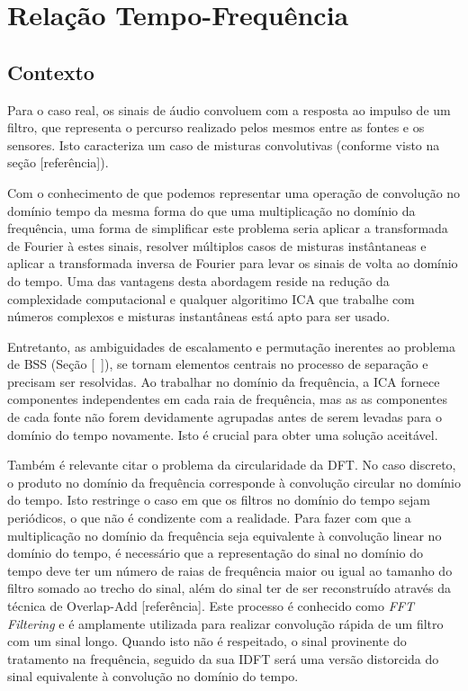 
\section{Relação Tempo-Frequência}
    
    \subsection{Contexto}
        Para o caso real, os sinais de áudio convoluem com a resposta ao impulso de um filtro, que representa o percurso realizado pelos mesmos entre as fontes e os sensores. Isto caracteriza um caso de misturas convolutivas (conforme visto na seção [referência]). 
        
        Com o conhecimento de que podemos representar uma operação de convolução no domínio tempo da mesma forma do que uma multiplicação no domínio da frequência, uma forma de simplificar este problema seria aplicar a transformada de Fourier à estes sinais, resolver múltiplos casos de misturas instântaneas e aplicar a transformada inversa de Fourier para levar os sinais de volta ao domínio do tempo. Uma das vantagens desta abordagem reside na redução da complexidade computacional e qualquer algoritimo ICA que trabalhe com números complexos e misturas instantâneas está apto para ser usado.
        
        Entretanto, as ambiguidades de escalamento e permutação inerentes ao problema de BSS (Seção [~\href{cap1}]), se tornam elementos centrais no processo de separação e precisam ser resolvidas. Ao trabalhar no domínio da frequência, a ICA fornece componentes independentes em cada raia de frequência, mas as as componentes de cada fonte não forem devidamente agrupadas antes de serem levadas para o domínio do tempo novamente. Isto é crucial para obter uma solução aceitável.
        
        Também é relevante citar o problema da circularidade da DFT. No caso discreto, o produto no domínio da frequência corresponde à convolução circular no domínio do tempo. Isto restringe o caso em que os filtros no domínio do tempo sejam periódicos, o que não é condizente com a realidade. Para fazer com que a multiplicação no domínio da frequência seja equivalente à convolução linear no domínio do tempo, é necessário que a representação do sinal no domínio do tempo deve ter um número de raias de frequência maior ou igual ao tamanho do filtro somado ao trecho do sinal, além do sinal ter de ser reconstruído através da técnica de Overlap-Add [referência]. Este processo é conhecido como \textit{FFT Filtering} e é amplamente utilizada para realizar convolução rápida de um filtro com um sinal longo. Quando isto não é respeitado, o sinal provinente do tratamento na frequência, seguido da sua IDFT será uma versão distorcida do sinal equivalente à convolução no domínio do tempo.
    
